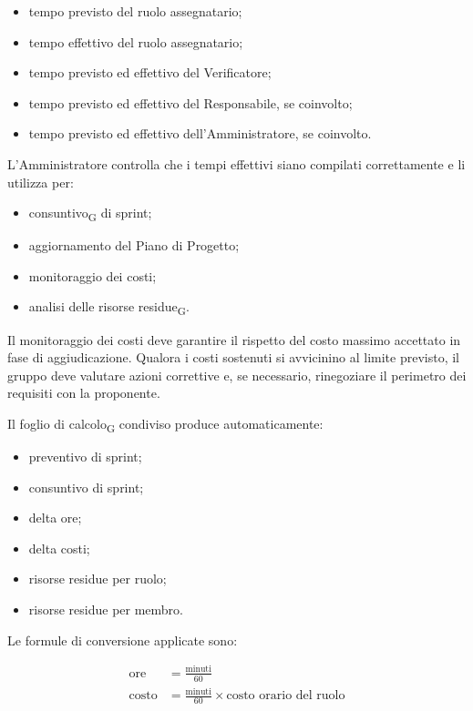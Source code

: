 \begin{itemize}
    \item tempo previsto del ruolo assegnatario;
    \item tempo effettivo del ruolo assegnatario;
    \item tempo previsto ed effettivo del Verificatore;
    \item tempo previsto ed effettivo del Responsabile, se coinvolto;
    \item tempo previsto ed effettivo dell'Amministratore, se coinvolto.
\end{itemize}

L'Amministratore controlla che i tempi effettivi siano compilati correttamente e
li utilizza per:

\begin{itemize}
    \item consuntivo\textsubscript{G} di sprint;
    \item aggiornamento del Piano di Progetto;
    \item monitoraggio dei costi;
    \item analisi delle risorse residue\textsubscript{G}.
\end{itemize}

Il monitoraggio dei costi deve garantire il rispetto del costo massimo accettato
in fase di aggiudicazione. Qualora i costi sostenuti si avvicinino al limite
previsto, il gruppo deve valutare azioni correttive e, se necessario, rinegoziare
il perimetro dei requisiti con la proponente.

Il foglio di calcolo\textsubscript{G} condiviso produce automaticamente:

\begin{itemize}
    \item preventivo di sprint;
    \item consuntivo di sprint;
    \item delta ore;
    \item delta costi;
    \item risorse residue per ruolo;
    \item risorse residue per membro.
\end{itemize}

Le formule di conversione applicate sono:

\begin{align*}
  \text{ore} &= \frac{\text{minuti}}{60} \\
  \text{costo} &= \frac{\text{minuti}}{60} \times \text{costo orario del ruolo}
\end{align*}

